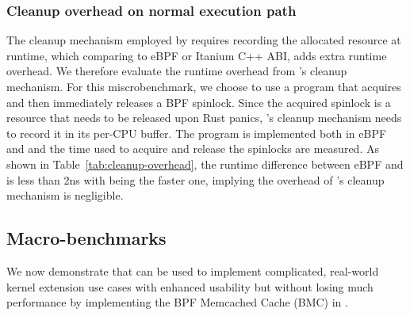 \subsubsection{Cleanup overhead on normal execution path}
The cleanup mechanism employed by \projname{} requires recording the allocated
    resource at runtime, which comparing to eBPF or Itanium C++ ABI, adds extra
    runtime overhead.
We therefore evaluate the runtime overhead from \projname{}'s cleanup
    mechanism.
For this miscrobenchmark, we choose to use a program that acquires and then
    immediately releases a BPF spinlock.
Since the acquired spinlock is a resource that needs to be released upon Rust
    panics, \projname{}'s cleanup mechanism needs to record it in its per-CPU
    buffer.
The program is implemented both in eBPF and \projname{} and the time used to
    acquire and release the spinlocks are measured.
As shown in Table~\ref{tab:cleanup-overhead}, the runtime difference between
    eBPF and \projname{} is less than 2ns with \projname{} being the faster
    one, implying the overhead of \projname{}'s cleanup mechanism is
    negligible.

\subsection{Macro-benchmarks}
\label{eval:macro}
We now demonstrate that \projname{} can be used to implement complicated,
    real-world kernel extension use cases with enhanced usability but without
    losing much performance by implementing the BPF Memcached Cache (BMC) in
    \projname{}.

%

